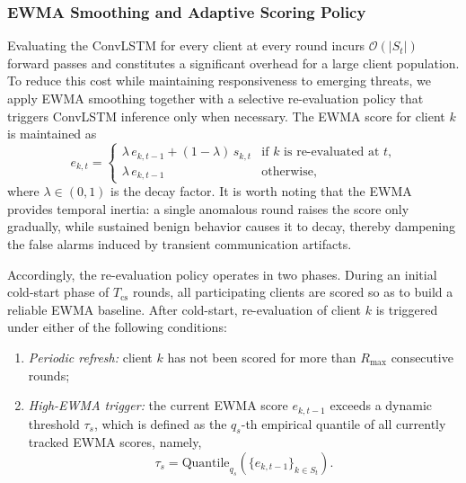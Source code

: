\documentclass[journal]{IEEEtran}
\begin{document}
\subsubsection{EWMA Smoothing and Adaptive Scoring Policy}
Evaluating the ConvLSTM for every client at every round incurs $\mathcal{O}(|S_t|)$ forward passes and constitutes a significant overhead for a large client population. To reduce this cost while maintaining responsiveness to emerging threats, we apply EWMA smoothing together with a selective re-evaluation policy that triggers ConvLSTM inference only when necessary. The EWMA score for client $k$ is maintained as
\begin{equation}
e_{k,t} =
\begin{cases}
\lambda \, e_{k,t-1} + (1 - \lambda) \, s_{k,t} & \text{if $k$ is re-evaluated at $t$,}\\
\lambda \, e_{k,t-1} & \text{otherwise,}
\end{cases}
\label{eq:ewma}
\end{equation}
where $\lambda \in (0,1)$ is the decay factor. It is worth noting that the EWMA provides temporal inertia: a single anomalous round raises the score only gradually, while sustained benign behavior causes it to decay, thereby dampening the false alarms induced by transient communication artifacts.

Accordingly, the re-evaluation policy operates in two phases. During an initial cold-start phase of $T_{\mathrm{cs}}$ rounds, all participating clients are scored so as to build a reliable EWMA baseline. After cold-start, re-evaluation of client $k$ is triggered under either of the following conditions:
\begin{enumerate}
    \item \textit{Periodic refresh:} client $k$ has not been scored for more than $R_{\max}$ consecutive rounds;
    \item \textit{High-EWMA trigger:} the current EWMA score $e_{k,t-1}$ exceeds a dynamic threshold $\tau_s$, which is defined as the $q_s$-th empirical quantile of all currently tracked EWMA scores, namely,
    \begin{equation}
    \tau_s = \text{Quantile}_{q_s}\!\left(\{e_{k,t-1}\}_{k \in S_t}\right).
    \label{eq:trigger_threshold}
    \end{equation}
\end{enumerate}
\end{document}
